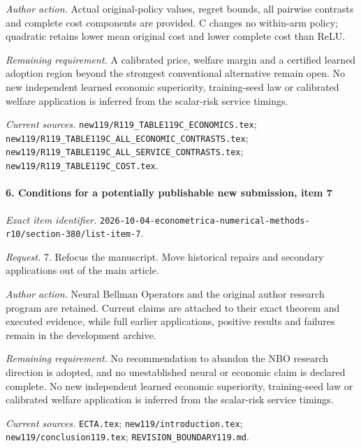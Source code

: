 \par\emph{Author action.} Actual original-policy values, regret bounds, all pairwise contrasts and complete cost components are provided. C changes no within-arm policy; quadratic retains lower mean original cost and lower complete cost than ReLU.

\par\emph{Remaining requirement.} A calibrated price, welfare margin and a certified learned adoption region beyond the strongest conventional alternative remain open. No new independent learned economic superiority, training-seed law or calibrated welfare application is inferred from the scalar-risk service timings.

\par\emph{Current sources.} \nolinkurl{new119/R119_TABLE119C_ECONOMICS.tex}; \nolinkurl{new119/R119_TABLE119C_ALL_ECONOMIC_CONTRASTS.tex}; \nolinkurl{new119/R119_TABLE119C_ALL_SERVICE_CONTRASTS.tex}; \nolinkurl{new119/R119_TABLE119C_COST.tex}.

\paragraph{6. Conditions for a potentially publishable new submission, item 7}

\emph{Exact item identifier.} \nolinkurl{2026-10-04-econometrica-numerical-methods-r10/section-380/list-item-7}.

\par\emph{Request.} 7. Refocus the manuscript. Move historical repairs and secondary applications out of the main article.

\par\emph{Author action.} Neural Bellman Operators and the original author research program are retained. Current claims are attached to their exact theorem and executed evidence, while full earlier applications, positive results and failures remain in the development archive.

\par\emph{Remaining requirement.} No recommendation to abandon the NBO research direction is adopted, and no unestablished neural or economic claim is declared complete. No new independent learned economic superiority, training-seed law or calibrated welfare application is inferred from the scalar-risk service timings.

\par\emph{Current sources.} \nolinkurl{ECTA.tex}; \nolinkurl{new119/introduction.tex}; \nolinkurl{new119/conclusion119.tex}; \nolinkurl{REVISION_BOUNDARY119.md}.

